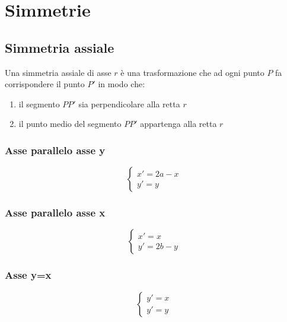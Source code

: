 \chapter{Simmetrie}
\section{Simmetria assiale}
Una simmetria assiale di asse $r$ è una trasformazione che ad ogni punto $P$ fa corrispondere il punto $P'$ in modo che:
\begin{enumerate}
	\item il segmento $PP'$ sia perpendicolare alla retta $r$
	\item il punto medio del segmento $PP'$ appartenga alla retta $r$
\end{enumerate}
\subsection{Asse parallelo asse y}
\begin{tcolorbox}[sidebyside,righthand width=7cm,colback=white,colframe=white,fonttitle=\bfseries	]
\[\begin{cases}
x'=2a-x\\
y'=y
\end{cases}
\]
\tcblower
	
\end{tcolorbox}
\subsection{Asse parallelo asse x}
\begin{tcolorbox}[sidebyside,righthand width=7cm,colback=white,colframe=white,fonttitle=\bfseries	]
		\[\begin{cases}
	x'=x\\
	y'=2b-y
	\end{cases}
	\]
	\tcblower
	
\end{tcolorbox}
\subsection{Asse y=x}
\begin{tcolorbox}[sidebyside,righthand width=7cm,colback=white,colframe=white,fonttitle=\bfseries	]
	\[\begin{cases}
	y'=x\\
	y'=y
	\end{cases}
	\]
\tcblower
		
\end{tcolorbox}

